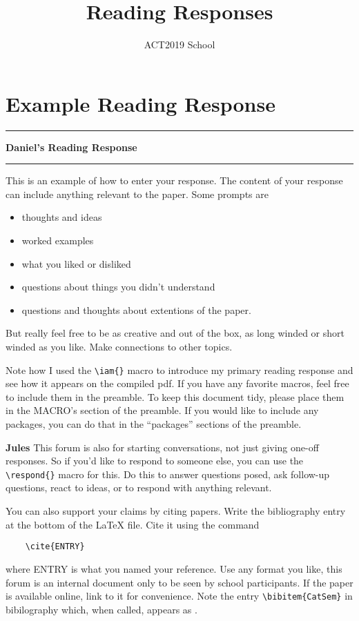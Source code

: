 \documentclass{amsart}
\author{ACT2019 School}
\title{Reading Responses}
\newcommand{\iam}[1]{
  \vspace{0.25em}
  \hrule
  \vspace{0.25em}
  \textbf{{#1}'s Reading Response}
  \vspace{0.25em}
  \hrule
  \vspace{1em}
}
\newcommand{\respond}[1]{
  \vspace{1em} \textbf{#1}
}
\begin{document}
\maketitle{}

\tableofcontents

\section{Example Reading Response}
\label{sec:ex-response}

\iam{Daniel}

This is an example of how to enter your response. The
content of your response can include anything relevant to
the paper.  Some prompts are
\begin{itemize}
\item thoughts and ideas
\item worked examples
\item what you liked or disliked
\item questions about things you didn't understand
\item questions and thoughts about extentions of the paper.
\end{itemize}
But really feel free to be as creative and out of the box,
as long winded or short winded as you like.  Make
connections to other topics.

Note how I used the \verb|\iam{}| macro to introduce my primary
reading response and see how it appears on the compiled pdf.
If you have any favorite macros, feel free to include them
in the preamble. To keep this document tidy, please place
them in the MACRO's section of the preamble.  If you would
like to include any packages, you can do that in the
``packages'' sections of the preamble.

\respond{Jules} This forum is also for starting
conversations, not just giving one-off responses.  So if
you'd like to respond to someone else, you can use the
\verb|\respond{}| macro for this. Do this to answer
questions posed, ask follow-up questions, react to ideas, or
to respond with anything relevant.

You can also support your claims by citing papers. Write
the bibliography entry at the bottom of the LaTeX file. Cite
it using the command
\begin{verbatim}
    \cite{ENTRY}
\end{verbatim}
where ENTRY is what you named your reference.  Use any
format you like, this forum is an internal document only to
be seen by school participants. If the paper is available
online, link to it for convenience. Note the entry
\verb|\bibitem{CatSem}| in bibilography which, when called,
appears as \cite{CatSem}.
\end{document}
